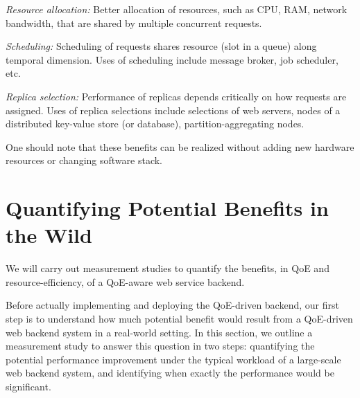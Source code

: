 \begin{packeditemize}

\item {\em Resource allocation:} 
Better allocation of resources, such as CPU, RAM, network bandwidth, that are shared by multiple concurrent requests. 

\item {\em Scheduling:}
Scheduling of requests shares resource (\eg slot in a queue) along temporal dimension.
Uses of scheduling include message broker, job scheduler, etc.

\item {\em Replica selection:}
Performance of replicas depends critically on how requests are assigned.
Uses of replica selections include selections of web servers, nodes of a distributed key-value store (or database), partition-aggregating nodes.

\end{packeditemize}
One should note that these benefits can be realized without adding new hardware resources or changing software stack.







\section{Quantifying Potential Benefits in the Wild}
\label{sec:quantifying}
\begin{task}
We will carry out measurement studies to quantify the benefits, in QoE and resource-efficiency, of a QoE-aware web service backend.
\end{task}

Before actually implementing and deploying the QoE-driven backend, our first step is to understand how much potential benefit would result from a QoE-driven web backend system in a real-world setting. 
In this section, we outline a measurement study to answer this question in two steps: quantifying the potential performance improvement under the typical workload of a large-scale web backend system, and identifying when exactly the performance would be significant.

